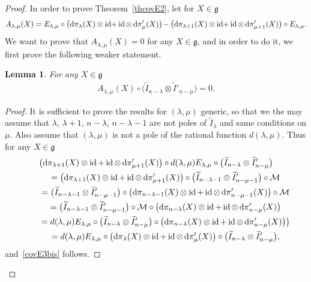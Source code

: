 \documentclass[pdftex]{sigma}
\DeclareMathOperator{\id}{id}
\numberwithin{equation}{section}
\newtheorem{lem}[theor]{Lemma}
\begin{document}
\begin{proof}
 In order to prove Theorem~\ref{thcovE2}, let for $X\in \mathfrak g$
 \begin{gather*}\label{covE3}
 A_{\lambda,\mu}(X) = E_{\lambda, \mu} \circ \big({{\rm d}}\pi_\lambda(X)\otimes \id\!+\id\otimes\, {{\rm d}}\pi'_\mu(X)\big)\!- \big({{\rm d}}\pi_{\lambda+1}(X)\otimes \id\!+\id\otimes\, {{\rm d}}\pi'_{\mu+1}(X)\big)\circ E_{\lambda, \mu}.
 \end{gather*}
 We want to prove that $A_{\lambda, \mu}(X)=0$ for any $X\in \mathfrak g$, and in order to do it, we first prove the following weaker statement.
 \begin{lem} For any $X\in \mathfrak g$
 \begin{gather}\label{covE3bis}
 A_{\lambda, \mu} (X)\circ \big(\widetilde I_{n-\lambda} \otimes \widetilde I'_{n-\mu}\big)=0.
 \end{gather}
 \end{lem}
\begin{proof}
It is sufficient to prove the results for $(\lambda, \mu)$ generic, so that we the may assume that $\lambda$, $\lambda+1$, $n-\lambda$, $n-\lambda-1$ are not poles of $\widetilde I_\lambda$ and same conditions on $\mu$. Also assume that $(\lambda, \mu)$ is not a pole of the rational function $d(\lambda, \mu)$. Thus for any $X\in \mathfrak g$
\begin{gather*}
\big({{\rm d}}\pi_{\lambda+1}(X)\otimes \id+\id\otimes\, {{\rm d}}\pi'_{\mu+1}(X)\big)\circ d(\lambda,\mu) E_{\lambda, \mu}\circ \big(\widetilde I_{n-\lambda}\otimes \widetilde I'_{n-\mu}\big)
\\ \qquad
{}= \big({{\rm d}}\pi_{\lambda+1}(X)\otimes \id+\id\otimes\, {{\rm d}}\pi'_{\mu+1}(X)\big)\circ \big(\widetilde I_{n-\lambda-1} \otimes \widetilde I'_{n-\mu-1} \big)\circ \mathcal{M}
\\ \qquad
{}= \big(\widetilde I_{n-\lambda-1} \otimes \widetilde I'_{n-\mu-1} \big)\circ \big({{\rm d}}\pi_{n-\lambda-1}(X)\otimes \id+\id\otimes\, {{\rm d}}\pi'_{n-\mu-1}(X)\big)\circ \mathcal{M}
\\ \qquad
{}=\big(\widetilde I_{n-\lambda-1} \otimes \widetilde I'_{n-\mu-1} \big)\circ \mathcal{M}\circ\big({{\rm d}}\pi_{n-\lambda}(X)\otimes \id+\id\otimes\,{{\rm d}}\pi'_{n-\mu}(X)\big)
\\ \qquad
{}= d(\lambda,\mu) E_{\lambda,\mu} \circ \big(\widetilde I_{n-\lambda} \otimes \widetilde I'_{n-\mu} \big)\circ \big({{\rm d}}\pi_{n-\lambda}(X)\otimes \id+\id\otimes\, {{\rm d}}\pi'_{n-\mu}(X)\big) \big)
\\ \qquad
{}= d(\lambda,\mu) E_{\lambda, \mu} \circ \big({{\rm d}}\pi_{\lambda}(X)\otimes \id+\id\otimes\, {{\rm d}}\pi'_{\mu}(X)\big)\circ \big(\widetilde I_{n-\lambda} \otimes \widetilde I'_{n-\mu} \big) ,
\end{gather*}
and~\eqref{covE3bis} follows.
\end{proof}


\end{proof}
\end{document}
